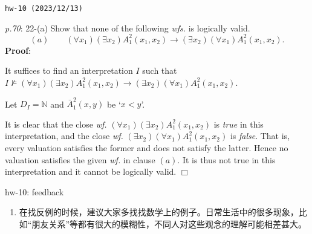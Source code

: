\documentclass[UTF8,12pt,a4paper]{ctexart}
\begin{document}
\noindent\texttt{hw-10 (2023/12/13)}

\emph{p.70}: 22-(a) \quad
Show that none of the following \textit{wfs.} is logically valid.
\[
(a) \qquad 
(\forall x_1) (\exists x_2) A^2_1(x_1,x_2) \to (\exists x_2) (\forall x_1) A^2_1 (x_1,x_2).
\]
\textbf{Proof}:   

It suffices to find an interpretation $I$ such that $I \not \models (\forall x_1) (\exists x_2) A^2_1(x_1,x_2) \to (\exists x_2) (\forall x_1) A^2_1 (x_1,x_2)$.

Let $D_I=\mathbb{N}$ and $\bar{A}^2_1(x,y)$ be `$x < y$'. 


It is clear that the close \textit{wf.} $(\forall x_1) (\exists x_2) A^2_1(x_1,x_2)$ is \textit{true} in this interpretation, 
and the close \textit{wf.} 
$(\exists x_2) (\forall x_1) A^2_1 (x_1,x_2)$ is \textit{false}. 
That is, every valuation satisfies the former and does not satisfy the latter. 
Hence no valuation satisfies the given \textit{wf.} in clause $(a)$. 
It is thus not true in this interpretation and it cannot be logically valid.
\hfill $\Box$


\vspace{1em}
\dotfill hw-10: feedback
\dotfill

\begin{enumerate}
	\item 在找反例的时候，建议大家多找找数学上的例子。日常生活中的很多现象，比如“朋友关系”等都有很大的模糊性，不同人对这些观念的理解可能相差甚大。
\end{enumerate}




\end{document}
